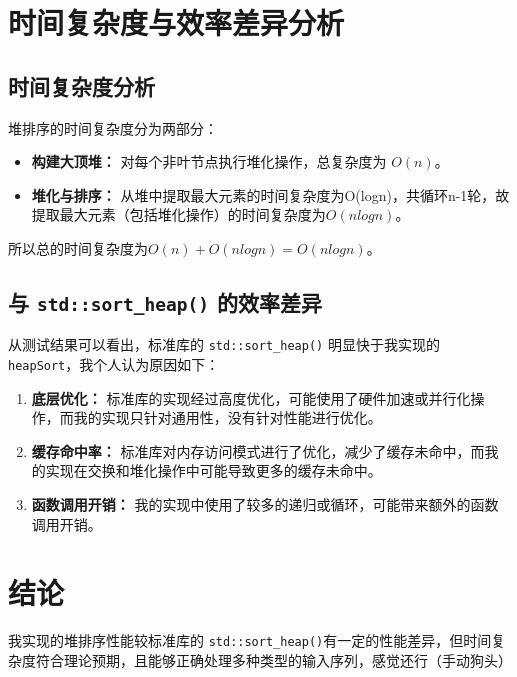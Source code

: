 \documentclass[UTF8]{ctexart}
\begin{document}
\section{时间复杂度与效率差异分析}
\subsection{时间复杂度分析}
堆排序的时间复杂度分为两部分：
\begin{itemize}
    \item \textbf{构建大顶堆：} 对每个非叶节点执行堆化操作，总复杂度为 $O(n)$。
    \item \textbf{堆化与排序：} 从堆中提取最大元素的时间复杂度为O(logn)，共循环n-1轮，故提取最大元素（包括堆化操作）的时间复杂度为$O(nlogn)$。
\end{itemize}

所以总的时间复杂度为$O(n)+O(nlogn)=O(nlogn)$。

\subsection{与 \texttt{std::sort\_heap()} 的效率差异}
从测试结果可以看出，标准库的 \texttt{std::sort\_heap()} 明显快于我实现的 \texttt{heapSort}，我个人认为原因如下：
\begin{enumerate}
    \item \textbf{底层优化：} 标准库的实现经过高度优化，可能使用了硬件加速或并行化操作，而我的实现只针对通用性，没有针对性能进行优化。
    \item \textbf{缓存命中率：} 标准库对内存访问模式进行了优化，减少了缓存未命中，而我的实现在交换和堆化操作中可能导致更多的缓存未命中。
    \item \textbf{函数调用开销：} 我的实现中使用了较多的递归或循环，可能带来额外的函数调用开销。
\end{enumerate}


\section{结论}
我实现的堆排序性能较标准库的 \texttt{std::sort\_heap()}有一定的性能差异，但时间复杂度符合理论预期，且能够正确处理多种类型的输入序列，感觉还行（手动狗头）
\end{document}
